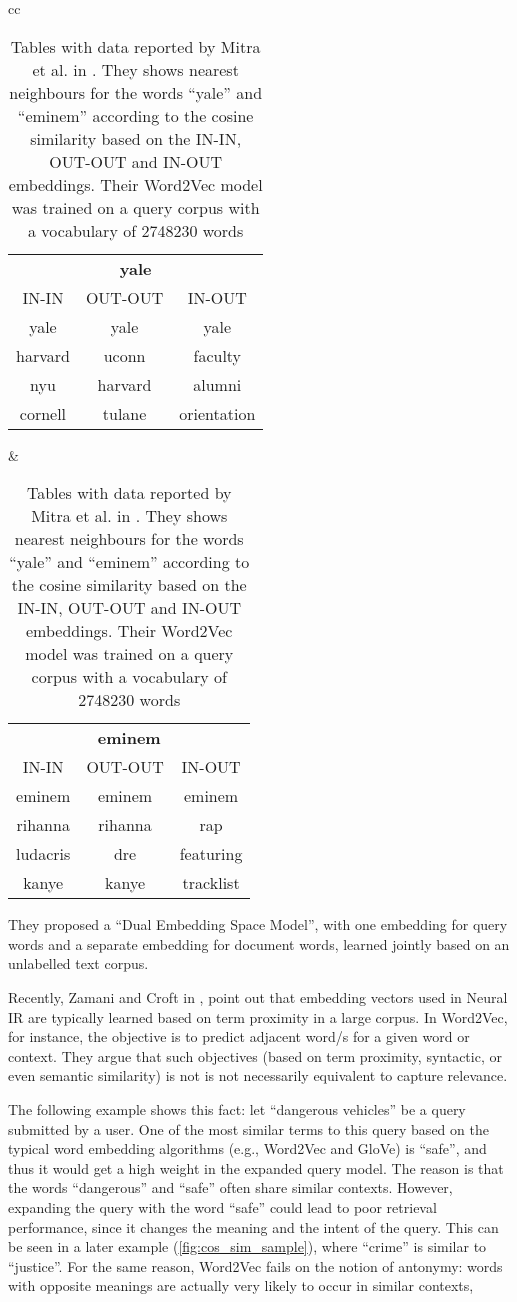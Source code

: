 \begin{table}[H]
\centering
\begin{tabular}{cc}   %
\begin{tabular}{ccc}
\hline
\multicolumn{3}{c}{\textbf{yale}} \\
IN-IN & OUT-OUT & IN-OUT \\ \hline
yale & yale & yale \\
harvard & uconn & faculty \\
nyu & harvard & alumni \\
cornell & tulane & orientation \\
\hline
\end{tabular} &
\begin{tabular}{ccc}
\hline
\multicolumn{3}{c}{\textbf{eminem}} \\
IN-IN & OUT-OUT & IN-OUT \\ \hline
eminem & eminem & eminem \\
rihanna & rihanna & rap \\
ludacris & dre & featuring \\
kanye & kanye & tracklist \\
\hline
\end{tabular}
\end{tabular}
\caption{Tables with data reported by Mitra et al. in \cite{Mitra2016ADE}. They shows nearest neighbours for the words ``yale'' and ``eminem'' according to the cosine similarity based on the IN-IN, OUT-OUT and IN-OUT embeddings. Their Word2Vec model was trained on a query corpus with a vocabulary of 2748230 words}
\label{tab:embsim}
\end{table}

They proposed a ``Dual Embedding Space Model'', with one embedding for query  words and a separate embedding for document words, learned jointly based on an unlabelled text corpus.

Recently, Zamani and Croft in \cite{relbasedwe}, point out that embedding vectors used in Neural IR are typically learned based on term proximity in a large corpus. In Word2Vec, for instance, the objective is to predict adjacent word/s for a given word or context. They argue that such objectives (based on term proximity, syntactic, or even semantic similarity) is not is not necessarily equivalent to capture relevance.

The following example shows this fact: let ``dangerous vehicles'' be a query submitted by a user. One of the most similar terms to this query based on the typical word embedding algorithms (e.g., Word2Vec and GloVe) is ``safe'', and thus it would get a high weight in the expanded query model. The reason is that the words ``dangerous'' and ``safe'' often share similar contexts. However, expanding the query with the word ``safe'' could lead to poor retrieval performance, since it changes the meaning and the intent of the query. This can be seen in a later example (\ref{fig:cos_sim_sample}), where ``crime'' is similar to ``justice''. For the same reason, Word2Vec fails on the notion of antonymy: words with opposite meanings are actually very likely to occur in similar contexts,


